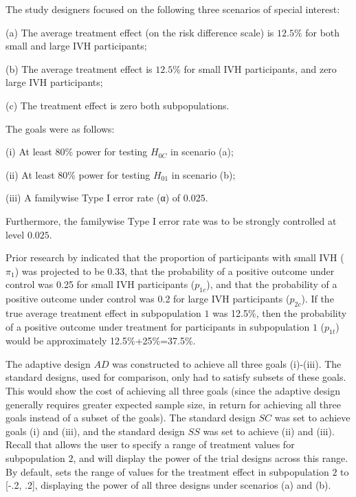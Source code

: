 \documentclass[article]{jss}
\begin{document}
The study designers focused on the following three scenarios of special interest:

\begin{description}
\item  (a) The average treatment effect (on the risk difference scale) is $12.5\%$ for both small and large IVH participants;
\item  (b) The average treatment effect is $12.5\%$ for small IVH participants, and zero large IVH participants;
\item  (c) The treatment effect is zero both subpopulations. 
\end{description}

The goals were as follows:

\begin{description}
\item  (i) At least 80\% power for testing $H_{0C}$ in scenario (a);
\item  (ii) At least 80\% power for testing $H_{01}$ in scenario (b);
\item  (iii) A familywise Type I error rate (α) of $0.025$.
\end{description}
Furthermore, the familywise Type I error rate was to be strongly controlled at level $0.025$.

Prior research by \cite{Hanley2012} indicated that the proportion of participants with small IVH ($π_1$) was projected to be 0.33, that the probability of a positive outcome under control was 0.25 for small IVH participants ($p_{1c}$), and that the probability of a positive outcome under control was 0.2 for large IVH participants ($p_{2c}$).  If the true average treatment effect in subpopulation $1$ was 12.5\%, then the probability of a positive outcome under treatment for participants in subpopulation $1$ ($p_{1t}$) would be approximately 12.5\%+25\%=37.5\%.

The adaptive design $AD$ was constructed to achieve all three goals (i)-(iii). The standard designs, used for comparison, only had to satisfy subsets of these goals. This would show the cost of achieving all three goals (since the adaptive design generally requires greater expected sample size, in return for achieving all three goals instead of a subset of the goals). 
The standard design $SC$ was set to achieve goals (i) and (iii), and the standard design $SS$ was set to achieve (ii) and (iii). Recall that  allows the user to specify a range of treatment values for subpopulation $2$, and will display the power of the trial designs across this range. By default,  sets the range of values for the treatment effect in subpopulation $2$ to [-.2, .2], displaying the power of all three designs under scenarios (a) and (b). 
 
\end{document}
